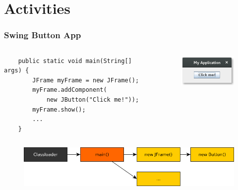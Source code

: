 \section{Activities}

\begin{frame}[c,fragile]
	\frametitle{Swing Button App}
	\begin{columns}
	\begin{lstlisting}
	public static void main(String[] args) {
	    JFrame myFrame = new JFrame();
	    myFrame.addComponent(
	        new JButton("Click me!"));
	    myFrame.show();
	    ...
	}
	\end{lstlisting}

	\pause
	\vspace{1cm}
	\begin{figure}
	\includegraphics[width=3cm]{pictures/activities/button-swing.png}
	\end{figure}
	\end{columns}

	\pause \vspace{0.5cm}
	\begin{figure}
	\includegraphics[width=\textwidth]{pictures/activities/call-hierachy-swing.png}
	\end{figure}
\end{frame}



